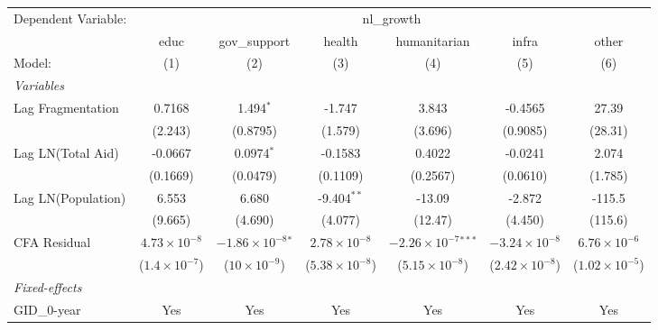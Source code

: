 \begingroup
\centering
\begin{tabular}{lcccccc}
   \tabularnewline \midrule \midrule
   Dependent Variable: & \multicolumn{6}{c}{nl\_growth}\\
                      & educ                   & gov\_support                 & health                  & humanitarian                   & infra                   & other \\   
   Model:             & (1)                    & (2)                          & (3)                     & (4)                            & (5)                     & (6)\\  
   \midrule
   \emph{Variables}\\
   Lag Fragmentation  & 0.7168                 & 1.494$^{*}$                  & -1.747                  & 3.843                          & -0.4565                 & 27.39\\   
                      & (2.243)                & (0.8795)                     & (1.579)                 & (3.696)                        & (0.9085)                & (28.31)\\   
   Lag LN(Total Aid)  & -0.0667                & 0.0974$^{*}$                 & -0.1583                 & 0.4022                         & -0.0241                 & 2.074\\   
                      & (0.1669)               & (0.0479)                     & (0.1109)                & (0.2567)                       & (0.0610)                & (1.785)\\   
   Lag LN(Population) & 6.553                  & 6.680                        & -9.404$^{**}$           & -13.09                         & -2.872                  & -115.5\\   
                      & (9.665)                & (4.690)                      & (4.077)                 & (12.47)                        & (4.450)                 & (115.6)\\   
   CFA Residual       & $4.73\times 10^{-8}$   & $-1.86\times 10^{-8}$$^{*}$  & $2.78\times 10^{-8}$    & $-2.26\times 10^{-7}$$^{***}$  & $-3.24\times 10^{-8}$   & $6.76\times 10^{-6}$\\    
                      & ($1.4\times 10^{-7}$)  & ($10\times 10^{-9}$)         & ($5.38\times 10^{-8}$)  & ($5.15\times 10^{-8}$)         & ($2.42\times 10^{-8}$)  & ($1.02\times 10^{-5}$)\\    
   \midrule
   \emph{Fixed-effects}\\
   GID\_0-year        & Yes                    & Yes                          & Yes                     & Yes                            & Yes                     & Yes\\  

\end{tabular}
